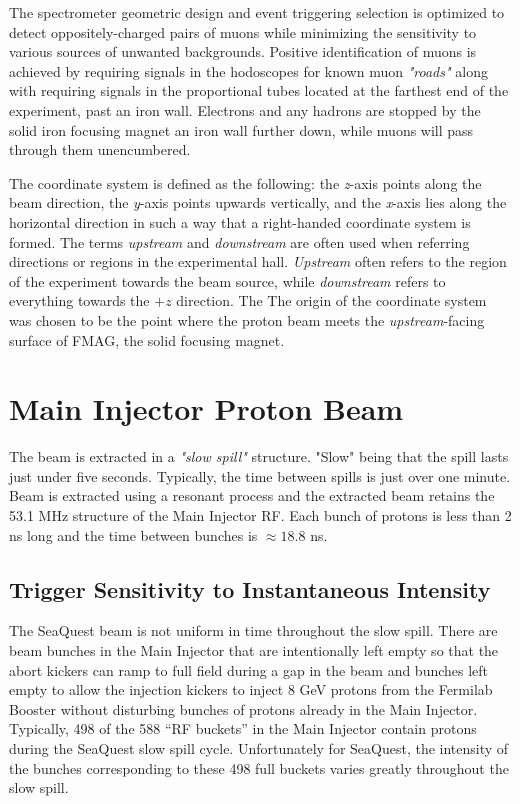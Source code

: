 The spectrometer geometric design and event
triggering selection is optimized to detect oppositely-charged pairs of muons while minimizing the sensitivity
to various sources of unwanted backgrounds. Positive identification of muons is achieved by requiring signals
in the hodoscopes for known muon \emph{"roads"} along with requiring signals in the proportional tubes located at
the farthest end of the experiment, past an iron wall. Electrons and any hadrons are stopped by the solid iron
focusing magnet an iron wall further down, while muons will pass through them unencumbered.

The coordinate system is defined as the following: the \emph{z}-axis points along the beam direction, the
\emph{y}-axis points upwards vertically, and the \emph{x}-axis lies along the horizontal direction
in such a way that a right-handed coordinate system is formed. The terms \emph{upstream} and 
\emph{downstream} are often used when referring directions or regions in the experimental hall.
\emph{Upstream} often refers to the region of the experiment towards the beam source, while
\emph{downstream} refers to everything towards the $+z$ direction. 
The The origin of the coordinate system was chosen to be the point where the proton beam meets 
the \emph{upstream}-facing surface of FMAG, the solid focusing magnet.


\section{Main Injector Proton Beam}

The beam is extracted in a \emph{"slow spill"} structure. "Slow" being that the spill lasts just under five seconds.  Typically, the time between spills is just over one minute.  Beam is extracted using a resonant process and the extracted beam retains the 53.1 MHz structure of the Main Injector RF.  Each bunch of protons is less than 2 ns long and the time between bunches is $\approx18.8$ ns.



\subsection{Trigger Sensitivity to Instantaneous Intensity}
The SeaQuest beam is not uniform in time throughout the slow spill.  There are beam bunches in the Main Injector that are intentionally left empty so that the abort kickers can ramp to full field during a gap in the beam and bunches left empty to allow the injection kickers to inject 8 GeV protons from the Fermilab Booster without disturbing bunches of protons already in the Main Injector.  Typically, 498 of the 588 ``RF buckets'' in the Main Injector contain protons during the SeaQuest slow spill cycle.  Unfortunately for SeaQuest, the intensity of the bunches corresponding to these 498 full buckets varies greatly throughout the slow spill.

